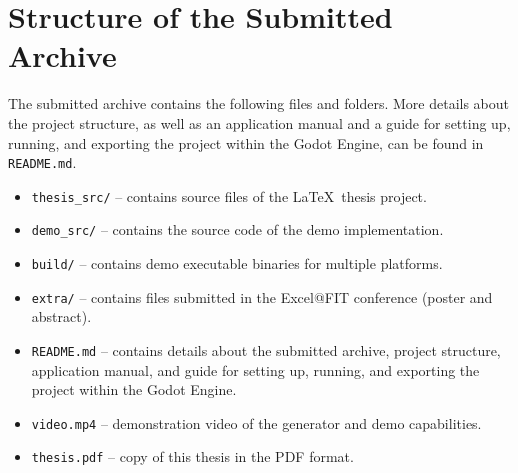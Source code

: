 \chapter{Structure of the Submitted Archive}

The submitted archive contains the following files and folders. More details about the project structure, as well as an application manual and a guide for setting up, running, and exporting the project within the Godot Engine, can be found in \texttt{README.md}.

\begin{itemize}
    \item \texttt{thesis\_src/} -- contains source files of the \LaTeX~thesis project.
    \item \texttt{demo\_src/} -- contains the source code of the demo implementation.
    \item \texttt{build/} -- contains demo executable binaries for multiple platforms.
    \item \texttt{extra/} -- contains files submitted in the Excel@FIT conference (poster and abstract).
    \item \texttt{README.md} -- contains details about the submitted archive, project structure, application manual, and guide for setting up, running, and exporting the project within the Godot Engine.
    \item \texttt{video.mp4} -- demonstration video of the generator and demo capabilities.
    \item \texttt{thesis.pdf} -- copy of this thesis in the PDF format.
\end{itemize}

